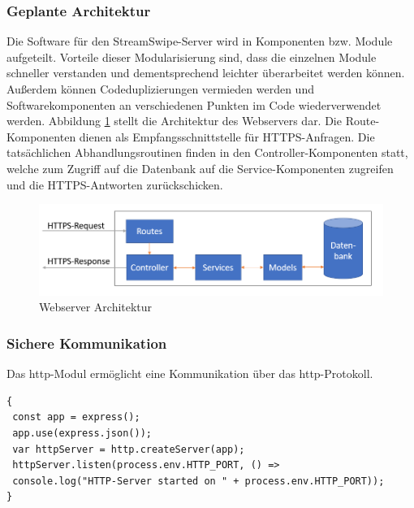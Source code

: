 \subsubsection{Geplante Architektur}
Die Software für den StreamSwipe-Server wird in Komponenten bzw. Module aufgeteilt. Vorteile dieser Modularisierung sind, dass die einzelnen Module schneller verstanden und dementsprechend leichter überarbeitet werden können. Außerdem können Codeduplizierungen vermieden werden und Softwarekomponenten an verschiedenen Punkten im Code wiederverwendet werden. Abbildung \ref{fig:WebserverArchitektur} stellt die Architektur des Webservers dar. Die Route-Komponenten dienen als Empfangsschnittstelle für HTTPS-Anfragen. Die tatsächlichen Abhandlungsroutinen finden in den Controller-Komponenten statt, welche zum Zugriff auf die Datenbank auf die Service-Komponenten zugreifen und die HTTPS-Antworten zurückschicken.
\begin{figure}[tbt]
\centering

\includegraphics[width=13cm]{images/backendstruktur.PNG}
\caption{Webserver Architektur}
\label{fig:WebserverArchitektur}
\end{figure}

\subsubsection{Sichere Kommunikation}
\label{sec:SichereKommunikation}
Das http-Modul ermöglicht eine Kommunikation über das http-Protokoll.\\
 
\begin{lstlisting}[caption=Einfache Verbindung, label=lst:nodejs_easyconnection]
{
 const app = express();
 app.use(express.json()); 
 var httpServer = http.createServer(app);
 httpServer.listen(process.env.HTTP_PORT, () => 
 console.log("HTTP-Server started on " + process.env.HTTP_PORT));
}
\end{lstlisting}

